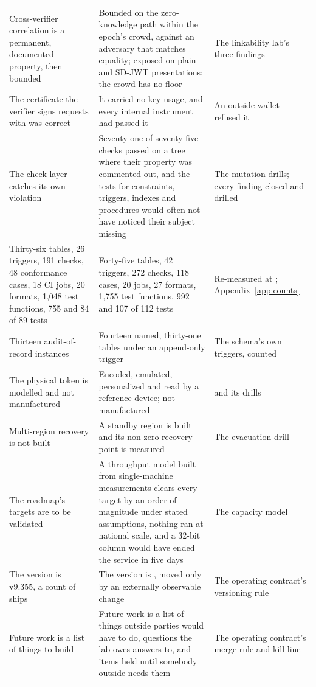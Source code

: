 {\begin{xltabular}{\textwidth}{>{\RaggedRight\arraybackslash\hspace{0pt}}p{2.0in} >{\RaggedRight\arraybackslash\hspace{0pt}}X >{\RaggedRight\arraybackslash\hspace{0pt}}p{1.6in}}
Cross-verifier correlation is a permanent, documented property, then bounded & Bounded on the zero-knowledge path within the epoch's crowd, against an adversary that matches equality; exposed on plain and SD-JWT presentations; the crowd has no floor & The linkability lab's three findings \\
The certificate the verifier signs requests with was correct & It carried no key usage, and every internal instrument had passed it & An outside wallet refused it \\
The check layer catches its own violation & Seventy-one of seventy-five checks passed on a tree where their property was commented out, and the tests for constraints, triggers, indexes and procedures would often not have noticed their subject missing & The mutation drills; every finding closed and drilled \\
Thirty-six tables, 26 triggers, 191 checks, 48 conformance cases, 18 CI jobs, 20 formats, 1,048 test functions, 755 and 84 of 89 tests & Forty-five tables, 42 triggers, 272 checks, 118 cases, 20 jobs, 27 formats, 1,755 test functions, 992 and 107 of 112 tests & Re-measured at ; Appendix~\ref{app:counts} \\
Thirteen audit-of-record instances & Fourteen named, thirty-one tables under an append-only trigger & The schema's own triggers, counted \\
The physical token is modelled and not manufactured & Encoded, emulated, personalized and read by a reference device; not manufactured &  and its drills \\
Multi-region recovery is not built & A standby region is built and its non-zero recovery point is measured & The evacuation drill \\
The roadmap's targets are to be validated & A throughput model built from single-machine measurements clears every target by an order of magnitude under stated assumptions, nothing ran at national scale, and a 32-bit column would have ended the service in five days & The capacity model \\
The version is v9.355, a count of ships & The version is , moved only by an externally observable change & The operating contract's versioning rule \\
Future work is a list of things to build & Future work is a list of things outside parties would have to do, questions the lab owes answers to, and items held until somebody outside needs them & The operating contract's merge rule and kill line \\
\end{xltabular}
}

